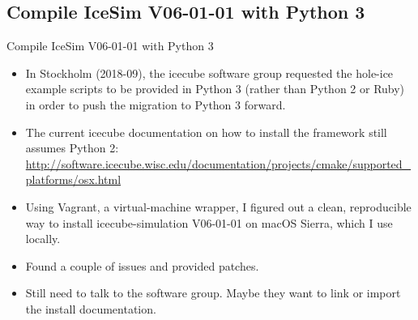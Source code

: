\subsection{\done Compile IceSim V06-01-01 with Python 3}
\begin{frame}{\done Compile IceSim V06-01-01 with Python 3}
  \begin{itemize}
    \item In Stockholm (2018-09), the icecube software group requested the hole-ice example scripts to be provided in Python 3 (rather than Python 2 or Ruby) in order to push the migration to Python 3 forward.
    \item The current icecube documentation on how to install the framework still assumes Python 2: \url{http://software.icecube.wisc.edu/documentation/projects/cmake/supported_platforms/osx.html}
    \item[\done] Using Vagrant, a virtual-machine wrapper, I figured out a clean, reproducible way to install icecube-simulation V06-01-01 on macOS Sierra, which I use locally.
    \item[\done] Found a couple of issues and provided patches.
    \item[\tobedone] Still need to talk to the software group. Maybe they want to link or import the install  documentation.
  \end{itemize}

  \bigskip {} \bigskip
\end{frame}

